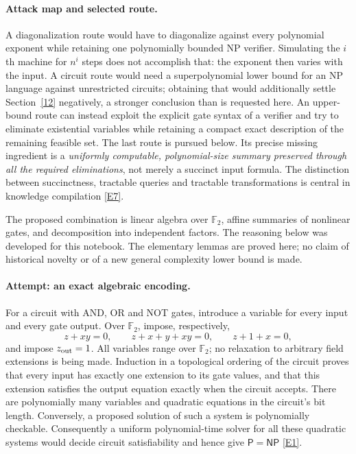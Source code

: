 \documentclass[11pt]{article}
\newcommand{\F}{\mathbb{F}}
\newcommand{\eref}[2]{\hyperlink{extra:#1:#2}{[E#2]}}
\begin{document}
\paragraph{Attack map and selected route.}
A diagonalization route would have to diagonalize against every polynomial
exponent while retaining one polynomially bounded NP verifier. Simulating the
$i$th machine for $n^i$ steps does not accomplish that: the exponent then varies
with the input. A circuit route would need a superpolynomial lower bound for
an NP language against unrestricted circuits; obtaining that would additionally
settle Section~\ref{12} negatively, a stronger conclusion than is requested
here. An upper-bound route can instead exploit the explicit gate syntax of a
verifier and try to eliminate existential variables while retaining a compact
exact description of the remaining feasible set. The last route is pursued
below. Its precise missing ingredient is a \emph{uniformly computable,
polynomial-size summary preserved through all the required eliminations},
not merely a succinct input formula. The distinction between succinctness,
tractable queries and tractable transformations is central in knowledge
compilation \eref{1}{7}.

The proposed combination is linear algebra over $\F_2$, affine summaries of
nonlinear gates, and decomposition into independent factors. The reasoning
below was developed for this notebook. The elementary lemmas are proved here;
no claim of historical novelty or of a new general complexity lower bound is
made.

\paragraph{Attempt: an exact algebraic encoding.}
For a circuit with AND, OR and NOT gates, introduce a variable for every input
and every gate output. Over $\F_2$, impose, respectively,
\begin{equation}\label{ra:1:gates}
 z+xy=0,\qquad z+x+y+xy=0,\qquad z+1+x=0,
\end{equation}
and impose $z_{\rm out}=1$. All variables range over $\F_2$; no relaxation to
arbitrary field extensions is being made. Induction in a topological ordering
of the circuit proves that every input has exactly one extension to its gate
values, and that this extension satisfies the output equation exactly when
the circuit accepts. There are polynomially many variables and quadratic
equations in the circuit's bit length. Conversely, a proposed solution of such
a system is polynomially checkable. Consequently a uniform polynomial-time
solver for all these quadratic systems would decide circuit satisfiability
and hence give $\mathsf P=\mathsf{NP}$ \eref{1}{1}.
\end{document}
